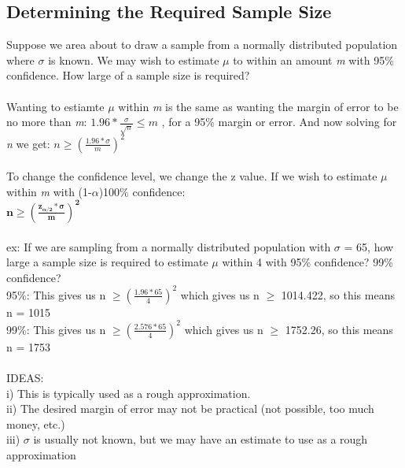 \documentclass[12pt, a4paper]{article}
\begin{document}
	\subsection{Determining the Required Sample Size}
	Suppose we area about to draw a sample from a normally distributed population where $\sigma$ is known. We may wish to estimate $\mu$ to within an amount \textit{m} with 95\% confidence. How large of a sample size is required? \\~\\
	Wanting to estiamte $\mu$ within \textit{m} is the same as wanting the margin of error to be no more than \textit{m}: $1.96*\frac{\sigma}{\sqrt{n}} \leq m$ , for a 95\% margin or error. And now solving for \textit{n} we get: 
	$n \geq (\frac{1.96*\sigma}{m})^2$ \\~\\
	To change the confidence level, we change the z value. If we wish to estimate $\mu$ within \textit{m} with (1-$\alpha$)100\% confidence: \\ \large $\mathbf{n \geq (\frac{z_{\alpha/2}* \sigma}{m})^2}$ \normalsize \\~\\
	ex: If we are sampling from a normally distributed population with $\sigma$ = 65, how large a sample size is required to estimate $\mu$ within 4 with 95\% confidence? 99\% confidence? \\
	95\%: This gives us n $\geq (\frac{1.96*65}{4})^2$ which gives us n $\geq$ 1014.422, so this means n = 1015 \\
	99\%: This gives us n $\geq (\frac{2.576*65}{4})^2$ which gives us n $\geq$ 1752.26, so this means n = 1753 \\~\\
	IDEAS: \\
	i) This is typically used as a rough approximation. \\
	ii) The desired margin of error may not be practical (not possible, too much money, etc.) \\
	iii) $\sigma$ is usually not known, but we may have an estimate to use as a rough approximation \newpage
	
\end{document}
